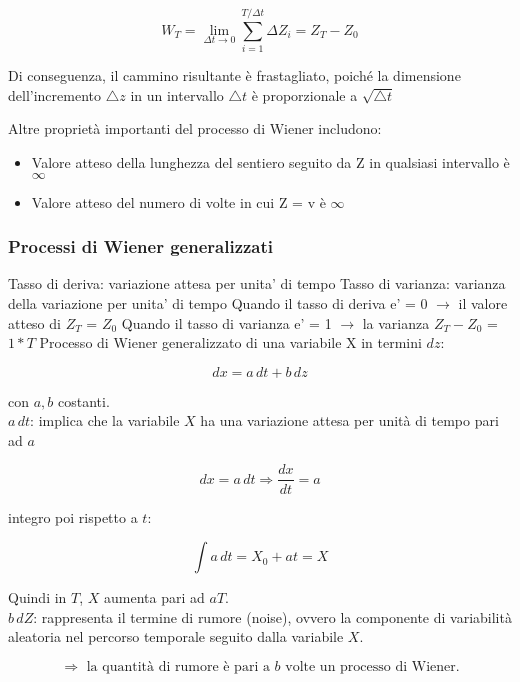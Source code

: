 \documentclass[12pt,a4paper]{report}
\begin{document}
\[
W_T = \lim_{\Delta t \to 0} \sum_{i=1}^{T / \Delta t} \Delta Z_i = Z_T - Z_0
\]

Di conseguenza, il cammino risultante è frastagliato, poiché la dimensione dell'incremento \(\bigtriangleup z\) in un intervallo \(\bigtriangleup t\) è proporzionale a \(\sqrt{\bigtriangleup t}\)

Altre proprietà importanti del processo di Wiener includono:
\begin{itemize}
    \item Valore atteso della lunghezza del sentiero seguito da Z in qualsiasi intervallo è \(\infty\)
    \item Valore atteso del numero di volte in cui Z = v è \(\infty\)
\end{itemize}
\subsubsection{Processi di Wiener generalizzati}
Tasso di deriva: variazione attesa per unita' di tempo
Tasso di varianza: varianza della variazione per unita' di tempo
\newline
Quando il tasso di deriva e' = 0
\newline
\(\rightarrow\) il valore atteso di \(Z_T\) = \(Z_0\)  
\newline
Quando il tasso di varianza e' = 1
\newline
\(\rightarrow\) la varianza \(Z_T - Z_0\) = \(1*T\)
\newline
Processo di Wiener generalizzato di una variabile X in termini \( dz \):

\[
dx = a \, dt + b \, dz 
\]

con \( a, b \) costanti.\\

\( a \, dt \): implica che la variabile \( X \) ha una variazione attesa per unità di tempo pari ad \( a \)

\[
dx = a \, dt \Longrightarrow  \frac{dx}{dt} = a
\]

integro poi rispetto a \( t \):

\[
\int a \, dt = X_0 + at = X
\]

Quindi in \( T \), \( X \) aumenta pari ad \( aT \).\\

\( b \, dZ \): rappresenta il termine di rumore (noise), ovvero la componente di variabilità aleatoria nel percorso temporale seguito dalla variabile \( X \).

\[
\Longrightarrow \text{ la quantità di rumore è pari a } b \text{ volte un processo di Wiener}.
\]
\end{document}
